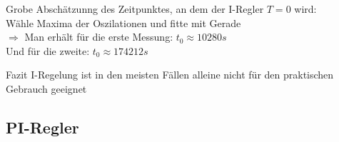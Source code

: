 \documentclass[compress,11pt]{beamer}
\begin{document}
\begin{frame}
Grobe Abschätzunng des Zeitpunktes, an dem der I-Regler $T = 0$ wird:\\
Wähle Maxima der Oszilationen und fitte mit Gerade\\
$\Rightarrow$ Man erhält für die erste Messung:  $t_0 \approx 10280 s$\\
Und für die zweite:  $t_0 \approx 174212 s$
\begin{block}{Fazit}
I-Regelung ist in den meisten Fällen alleine nicht für den praktischen Gebrauch geeignet
\end{block}
\end{frame}
\subsection{PI-Regler}
\end{document}
